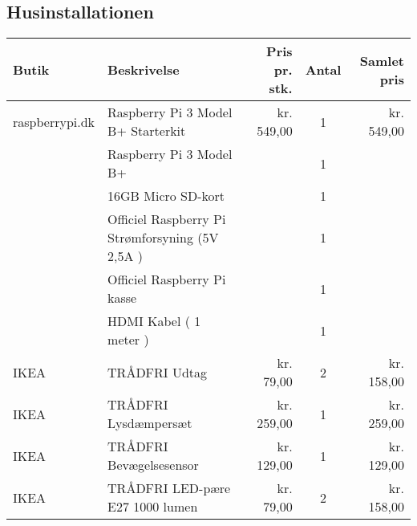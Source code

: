 \subsection{Husinstallationen}
\begin{tabular}[c]{|l|l|r|c|r|}
    \hline
    Butik & Beskrivelse & Pris pr. stk. & Antal & Samlet pris \\
    \hline \hline
    raspberrypi.dk & Raspberry Pi 3 Model B+ Starterkit &  kr. 549,00 & 1 & kr. 549,00 \\
     & Raspberry Pi 3 Model B+ & & 1 & \\
     & 16GB Micro SD-kort & & 1 & \\
     & Officiel Raspberry Pi Strømforsyning (5V \@ 2,5A ) & & 1 & \\
     & Officiel Raspberry Pi kasse & & 1 & \\
     & HDMI Kabel ( 1 meter ) & & 1 & \\
     \hline
     IKEA & TRÅDFRI Udtag & kr. 79,00 & 2 & kr. 158,00 \\
     \hline
     IKEA & TRÅDFRI Lysdæmpersæt & kr. 259,00 & 1 & kr. 259,00 \\
     \hline
     IKEA & TRÅDFRI Bevægelsesensor & kr. 129,00 & 1 & kr. 129,00 \\
     \hline
     IKEA & TRÅDFRI LED-pære E27 1000 lumen & kr. 79,00 & 2 & kr. 158,00 \\
     \hline

\end{tabular}